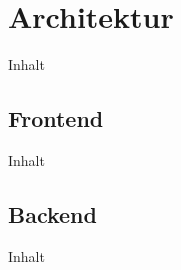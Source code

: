 \chapter{Architektur\label{chap3:Drittes-Kapitel}}

Inhalt

\section{Frontend\label{sec3.1:Unterpunkt-1}}

Inhalt

\section{Backend\label{sec3.2:Unterpunkt-2}}

Inhalt
